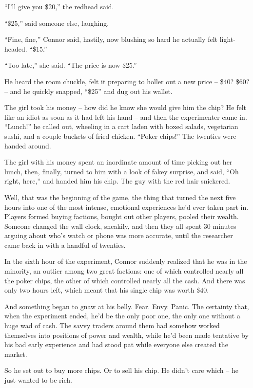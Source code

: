 ``I'll give you \$20,'' the redhead said.

``\$25,'' said someone else, laughing.

``Fine, fine,'' Connor said, hastily, now blushing so hard he
actually felt light-headed. ``\$15.''

``Too late,'' she said. ``The price is now \$25.''

He heard the room chuckle, felt it preparing to holler out a new
price -- \$40? \$60? -- and he quickly snapped, ``\$25'' and dug out
his wallet.

The girl took his money -- how did he know she would give him the
chip? He felt like an idiot as soon as it had left his hand -- and
then the experimenter came in. ``Lunch!'' he called out, wheeling in
a cart laden with boxed salads, vegetarian sushi, and a couple
buckets of fried chicken. ``Poker chips!'' The twenties were handed
around.

The girl with his money spent an inordinate amount of time picking
out her lunch, then, finally, turned to him with a look of fakey
surprise, and said, ``Oh right, here,'' and handed him his chip. The
guy with the red hair snickered.

Well, that was the beginning of the game, the thing that turned the
next five hours into one of the most intense, emotional experiences
he'd ever taken part in. Players formed buying factions, bought out
other players, pooled their wealth. Someone changed the wall clock,
sneakily, and then they all spent 30 minutes arguing about who's
watch or phone was more accurate, until the researcher came back in
with a handful of twenties.

In the sixth hour of the experiment, Connor suddenly realized that
he was in the minority, an outlier among two great factions: one of
which controlled nearly all the poker chips, the other of which
controlled nearly all the cash. And there was only two hours left,
which meant that his single chip was worth \$40.

And something began to gnaw at his belly. Fear. Envy. Panic. The
certainty that, when the experiment ended, he'd be the only poor
one, the only one without a huge wad of cash. The savvy traders
around them had somehow worked themselves into positions of power
and wealth, while he'd been made tentative by his bad early
experience and had stood pat while everyone else created the
market.

So he set out to buy more chips. Or to sell his chip. He didn't
care which -- he just wanted to be rich.

